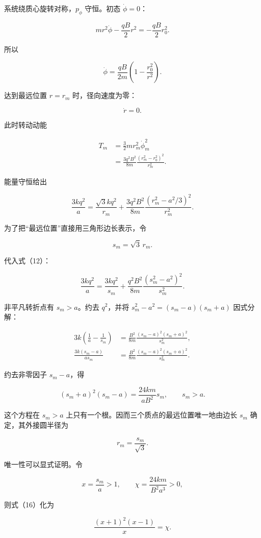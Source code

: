 \documentclass[12pt,a4paper,UTF8]{ctexart}
\begin{document}
系统绕质心旋转对称，\(p_\phi\) 守恒。初态 \(\dot\phi=0\)：

\[
mr^2\dot\phi-\frac{qB}{2}r^2
=-\frac{qB}{2}r_0^2.
\tag{8}
\]

所以

\[
\dot\phi
=\frac{qB}{2m}
\left(1-\frac{r_0^2}{r^2}\right).
\tag{9}
\]

达到最远位置 \(r=r_m\) 时，径向速度为零：

\[
\dot r=0.
\tag{10}
\]

此时转动动能

\[
\begin{aligned}
T_m
&=\frac32mr_m^2\dot\phi_m^2\\
&=\frac{3q^2B^2}{8m}
\frac{(r_m^2-r_0^2)^2}{r_m^2}.
\end{aligned}
\tag{11}
\]

能量守恒给出

\[
\boxed{
\frac{3kq^2}{a}
=\frac{\sqrt3kq^2}{r_m}
+\frac{3q^2B^2}{8m}
\frac{(r_m^2-a^2/3)^2}{r_m^2}
}.
\tag{12}
\]

为了把``最远位置''直接用三角形边长表示，令

\[
s_m=\sqrt3\,r_m.
\tag{13}
\]

代入式（12）：

\[
\frac{3kq^2}{a}
=\frac{3kq^2}{s_m}
+\frac{q^2B^2}{8m}
\frac{(s_m^2-a^2)^2}{s_m^2}.
\tag{14}
\]

非平凡转折点有 \(s_m>a\)。约去 \(q^2\)，并将
\(s_m^2-a^2=(s_m-a)(s_m+a)\) 因式分解：

\[
\begin{aligned}
3k\left(\frac1a-\frac1{s_m}\right)
&=\frac{B^2}{8m}
\frac{(s_m-a)^2(s_m+a)^2}{s_m^2},\\
\frac{3k(s_m-a)}{as_m}
&=\frac{B^2}{8m}
\frac{(s_m-a)^2(s_m+a)^2}{s_m^2}.
\end{aligned}
\tag{15}
\]

约去非零因子 \(s_m-a\)，得

\[
\boxed{
(s_m+a)^2(s_m-a)
=\frac{24km}{aB^2}s_m,
\qquad s_m>a
}.
\tag{16}
\]

这个方程在 \(s_m>a\) 上只有一个根。因而三个质点的最远位置唯一地由边长
\(s_m\) 确定，其外接圆半径为

\[
\boxed{r_m=\frac{s_m}{\sqrt3}}.
\tag{17}
\]

唯一性可以显式证明。令

\[
x=\frac{s_m}{a}>1,
\qquad
\chi=\frac{24km}{B^2a^3}>0,
\]

则式（16）化为

\[
\frac{(x+1)^2(x-1)}x=\chi.
\]
\end{document}
